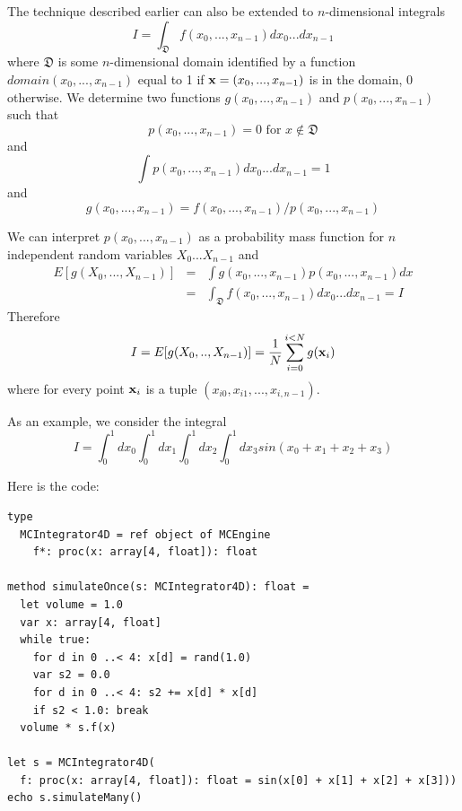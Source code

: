 \documentclass[justified, sixbynine]{tufte-book}
\theoremstyle{plain}%
\newtheorem * {corollary}{Corollary}
\theoremstyle{definition}
\theoremstyle{remark}
\newtheorem * {remark}{Remark}
\newtheorem * {note}{Note}
\begin{document}
\begin{fullwidth}
The technique described earlier can also be extended to $n$-dimensional integrals
\begin{equation}
I=\int_{{\mathfrak D}}f(x_0, ..., x_{n-1})dx_0...dx_{n-1}
\end{equation}
where ${\mathfrak D}$ is some $n$-dimensional domain identified by a function $%
domain(x_0, ..., x_{n-1})$ equal to 1 if ${\bf x}=(x_0, ..., x_{n-1})$ is in the
domain, 0 otherwise. We determine two functions $g(x_0, ..., x_{n-1})$ and $%
p(x_0, ..., x_{n-1})$ such that
\begin{equation}
p(x_0, ..., x_{n-1})=0\text{ for }x\notin {\mathfrak D}
\end{equation}
and
\begin{equation}
\int p(x_0, ..., x_{n-1})dx_0...dx_{n-1}=1
\end{equation}
and
\begin{equation}
g(x_0, ..., x_{n-1})=f(x_0, ..., x_{n-1})/p(x_0, ..., x_{n-1})
\end{equation}

We can interpret $p(x_0, ..., x_{n-1})$ as a probability mass function for $n$
independent random variables $X_0$...$X_{n-1}$ and
\begin{eqnarray}
E[g(X_0, ..., X_{n-1})] &=&\int g(x_0, ..., x_{n-1})p(x_0, ..., x_{n-1})dx \\
&=&\int_{{\mathfrak D}}f(x_0, ..., x_{n-1})dx_0...dx_{n-1}=I
\end{eqnarray}
Therefore
\begin{equation}
I=E[g(X_0, .., X_{n-1})] = \frac 1N\sum_{i=0}^{i<N}g({\bf x}_i)
\end{equation}
where for every point ${\bf x}_i$ is a tuple $(x_{i0}, x_{i1}, ..., x_{i, n-1})$.

As an example, we consider the integral
\begin{equation}
I = \int_0^1 dx_0 \int_0^1 dx_1 \int_0^1 dx_2 \int_0^1 dx_3 sin(x_0+x_1+x_2+x_3)
\end{equation}

Here is the code:
\begin{lstlisting}
type
  MCIntegrator4D = ref object of MCEngine
    f*: proc(x: array[4, float]): float

method simulateOnce(s: MCIntegrator4D): float =
  let volume = 1.0
  var x: array[4, float]
  while true:
    for d in 0 ..< 4: x[d] = rand(1.0)
    var s2 = 0.0
    for d in 0 ..< 4: s2 += x[d] * x[d]
    if s2 < 1.0: break
  volume * s.f(x)

let s = MCIntegrator4D(
  f: proc(x: array[4, float]): float = sin(x[0] + x[1] + x[2] + x[3]))
echo s.simulateMany()
\end{lstlisting}


\end{fullwidth}
\end{document}
